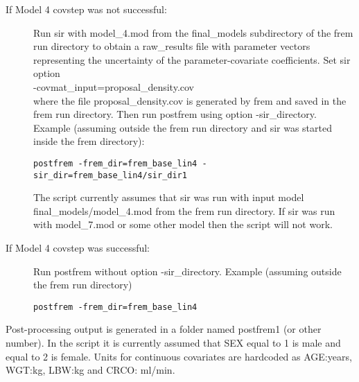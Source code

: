 \begin{description}
\item[If Model 4 covstep was not successful:]
Run sir
with model\_4.mod from the final\_models subdirectory of the frem run directory
to obtain a raw\_results file with parameter vectors representing the uncertainty of the parameter-covariate coefficients.
Set sir option\\
-covmat\_input=proposal\_density.cov\\
where
the file proposal\_density.cov
is generated by frem and saved in the frem run directory. Then run postfrem using option -sir\_directory.
Example (assuming outside the frem run directory and sir was started inside the frem directory):
\begin{verbatim}
postfrem -frem_dir=frem_base_lin4 -sir_dir=frem_base_lin4/sir_dir1
\end{verbatim}
The script currently assumes that sir was run with input model final\_models/model\_4.mod from the
frem run directory. If sir was run with model\_7.mod or some other model then the script will not work.

\item[If Model 4 covstep was successful:] Run postfrem without option -sir\_directory.
Example (assuming outside the frem run directory)
\begin{verbatim}
postfrem -frem_dir=frem_base_lin4
\end{verbatim}
\end{description}

\noindent Post-processing output is generated in a folder named postfrem1 (or other number).
In the script it is currently assumed that SEX equal to 1 is male and equal to 2 is female.
Units for continuous covariates are hardcoded as
AGE:years, WGT:kg, LBW:kg and CRCO: ml/min.

